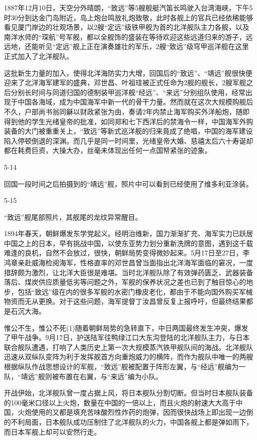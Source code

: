 \documentclass[12pt,UTF8]{ctexbook}
\begin{document}
1887年12月10日，天空分外晴朗，“致远”等5艘舰艇汽笛长鸣驶入台湾海峡，下午5时30分到达金门岛附近，岛上炮台鸣放礼炮致敬，此时各舰上的官兵已经依稀能够看见厦门岸边的壮观场景，以2艘“定远”级铁甲舰为首的北洋舰队主力各舰，以及南洋水师的“琛航”号军舰，都以全舰饰的盛装在等待欢迎这些远道归来的游子，远远地，还能听见“定远”舰上正在演奏雄壮的军乐，2艘“致远”级穹甲巡洋舰在这里正式加入了北洋舰队。

这批新生力量的加入，使得北洋海防实力大增，回国后的“致远”、“靖远”舰很快便迎来了北洋海军建军的盛典，邓世昌、叶祖珪被正式任命为2舰的舰长，2艘军舰之后分别长时间与同道归国的德制装甲巡洋舰“经远”、“来远”分别组队使用，经常出现于中国各海域，成为中国海军中新一代的骨干力量。然而就在这次大规模购舰后不久，户部尚书翁同龢以财政紧张为由，奏请2年内禁止海军购买外洋船炮，随即得到他的学生光绪皇帝的批准，如同郑和七下西洋后的禁海令一样，中国海军外购装备的大门被重重关上，“致远”等新式巡洋舰的归来竟成了绝唱，中国的海军建设陷入停顿倒退的深渊。而几乎是同一时间里，光绪皇帝大婚、慈禧太后六十寿诞却都在耗费巨资，大操大办，丝毫未体现出任何一点国帑紧张的迹象。

5-14

回国一段时间之后拍摄到的“靖远”舰，照片中可以看到已经使用了维多利亚涂装。

5-15

“致远”舰尾部照片，其舰尾的龙纹异常醒目。

1894年春天，朝鲜爆发东学党起义。经明治维新，国力渐渐扩充、海军实力已跃居中国之上的日本，早有挑战中国，以使东亚势力划分重新洗牌的意图，遇到这千载难逢的良机，自然不会放过，很快，朝鲜局势变得微妙起来。5月17日至27日，李鸿章亲赴威海检阅海军，性格直率的邓世昌曾当面指出北洋海军面临的窘况，一度措辞颇为激烈，让北洋大臣很是难堪。当时北洋舰队除了有效弹药匮乏、武器装备落后、煤炭供应质量低劣等问题之外，军舰的保养状况之差也已到了触目惊心的地步，包括“致远”级在内的很多军舰的水密门橡皮老化，都由于不能向国外购买军械物资而无从更换。对于这些问题，海军提督丁汝昌曾反复上报呼吁，但最终结果都是石沉大海。

惟公不生，惟公不死(1)随着朝鲜局势的急转直下，中日两国最终发生冲突，爆发了甲午战争。9月17日，护送陆军往鸭绿江口大东沟登陆的北洋舰队主力，与日本联合舰队遭遇，打响了人类历史上第一次大规模蒸汽铁甲舰队间的海战。北洋舰队迅速从双纵队变阵为利于发挥舰首方向重炮威力的横阵，而作为舰队中唯一的两艘根据纵队作战思想设计的军舰，“致远”舰被配置于阵形左翼，与“经远”舰编为一队，“靖远”舰则被布置在右翼，与“来远”编为小队。

开战伊始，北洋舰队曾一度占据上风，将日本舰队分割切断。但当时日本舰队装备的100毫米口径以上火炮，数量在中国的一倍以上，而且火炮的射速大大高于中国，火炮使用的又都是填充苦味酸烈性炸药的炮弹，因而很快战场上即出现一边倒的不利局面，日本舰队成功压制住了北洋舰队的火力，中国各舰上都是弹如雨下，而日本军舰上却可以安然行走。
\end{document}
